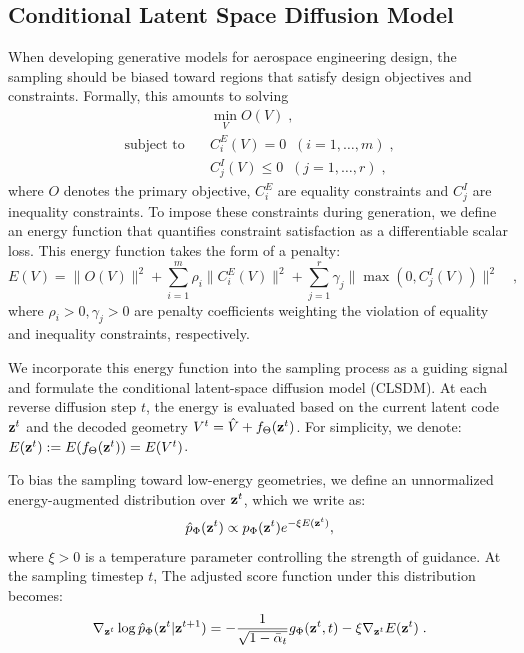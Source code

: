 \subsection{Conditional Latent Space Diffusion Model}
When developing generative models for aerospace engineering design, the sampling should be biased toward regions that satisfy design objectives and constraints. Formally, this amounts to solving
\begin{align}
    & \min_{V} O(V) \; , \nonumber\\
    \text{subject to} \quad & C^E_i(V) = 0 \;\; (i=1,\dots,m) \; , \\
    & C^I_j(V) \le 0 \;\; (j=1,\dots,r) \; , \nonumber
\end{align}
where $O$ denotes the primary objective, $C^E_i$ are equality constraints and $C^I_j$ are inequality constraints. 
%
To impose these constraints during generation, we define an energy function that quantifies constraint satisfaction as a differentiable scalar loss. This energy function takes the form of a penalty:
\begin{equation}
    E(V)=\bigl\|O(V)\bigr\|^2 + \sum_{i=1}^m \rho_i \bigl\|C^E_i(V)\bigr\|^2 + \sum_{j=1}^r \gamma_j \bigl\|\max(0,C^I_j(V))\bigr\|^2 \quad ,
    \label{ch6:eq:energy_guidance}
\end{equation}
where $\rho_i > 0, \gamma_j > 0$ are penalty coefficients weighting the violation of equality and inequality constraints, respectively.

We incorporate this energy function into the sampling process as a guiding signal and formulate the conditional latent-space diffusion model (CLSDM). At each reverse diffusion step $t$, the energy is evaluated based on the current latent code $\mathbf{z}^t$ and the decoded geometry $V^t=\hat{V}+f_\Theta(\mathbf{z}^t)$. For simplicity, we denote: $E(\mathbf{z}^t):=E(f_\Theta(\mathbf{z}^t))=E(V^t)$.

To bias the sampling toward low-energy geometries, we define an unnormalized energy-augmented distribution over $\mathbf{z}^t$, which we write as:
\begin{equation}
    \hat{p}_\Phi(\mathbf{z}^t) \propto p_\Phi(\mathbf{z}^t)e^{-\xi E(\mathbf{z}^t)},
\end{equation}
where $\xi>0$ is a temperature parameter controlling the strength of guidance. At the sampling timestep $t$, The adjusted score function under this distribution becomes:
\begin{equation}
    \nabla_{\mathbf{z}^t} \log \hat{p}_\Phi(\mathbf{z}^t|\mathbf{z}^{t+1})=-\frac{1}{\sqrt{1-\Bar{\alpha}_t}}  g_\Phi(\mathbf{z}^t, t) - \xi\nabla_{\mathbf{z}^t}E(\mathbf{z}^t)\;.
\end{equation}

